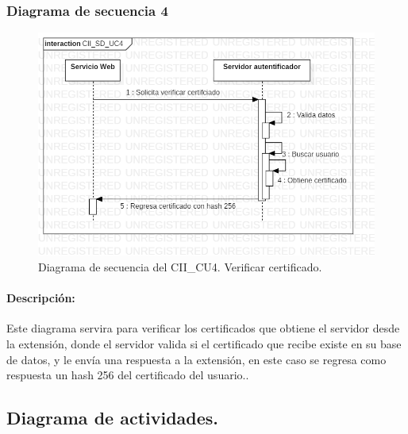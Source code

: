 \documentclass[12pt, a4paper, titlepage]{report}
\begin{document}
    		    \subsubsection{Diagrama de secuencia 4}
            	\begin{figure}[H]
    			    \begin{center} \includegraphics[width=12cm]{./imagenes/Disenio/Componente_2/CII_SD_UC4.png}
    			    \caption[Diagrama de secuencia 4 del Componente II]{Diagrama de secuencia del CII\_CU4. Verificar certificado.}
    		        \end{center}
    		    \end{figure}
    		    
    		    \paragraph{Descripción:} Este diagrama servira para verificar los certificados que obtiene el servidor desde la extensión, donde el servidor valida si el certificado que recibe existe en su base de datos, y le envía una respuesta a la extensión, en este caso se regresa como respuesta un hash 256 del certificado del usuario..
    		    
	        \subsection{Diagrama de actividades.}
	    
\end{document}

